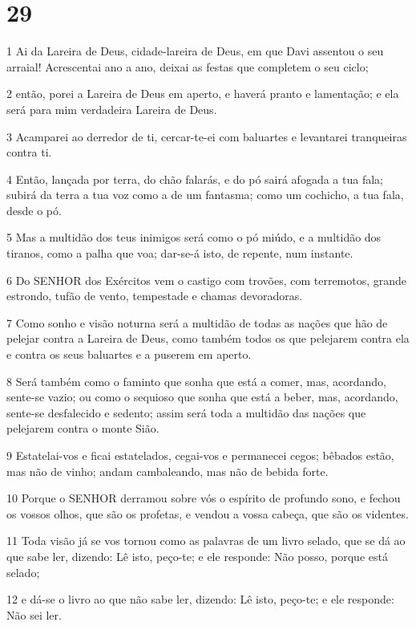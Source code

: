 \chapter{29}

\par 1 Ai da Lareira de Deus, cidade-lareira de Deus, em que Davi assentou o seu arraial! Acrescentai ano a ano, deixai as festas que completem o seu ciclo;
\par 2 então, porei a Lareira de Deus em aperto, e haverá pranto e lamentação; e ela será para mim verdadeira Lareira de Deus.
\par 3 Acamparei ao derredor de ti, cercar-te-ei com baluartes e levantarei tranqueiras contra ti.
\par 4 Então, lançada por terra, do chão falarás, e do pó sairá afogada a tua fala; subirá da terra a tua voz como a de um fantasma; como um cochicho, a tua fala, desde o pó.
\par 5 Mas a multidão dos teus inimigos será como o pó miúdo, e a multidão dos tiranos, como a palha que voa; dar-se-á isto, de repente, num instante.
\par 6 Do SENHOR dos Exércitos vem o castigo com trovões, com terremotos, grande estrondo, tufão de vento, tempestade e chamas devoradoras.
\par 7 Como sonho e visão noturna será a multidão de todas as nações que hão de pelejar contra a Lareira de Deus, como também todos os que pelejarem contra ela e contra os seus baluartes e a puserem em aperto.
\par 8 Será também como o faminto que sonha que está a comer, mas, acordando, sente-se vazio; ou como o sequioso que sonha que está a beber, mas, acordando, sente-se desfalecido e sedento; assim será toda a multidão das nações que pelejarem contra o monte Sião.
\par 9 Estatelai-vos e ficai estatelados, cegai-vos e permanecei cegos; bêbados estão, mas não de vinho; andam cambaleando, mas não de bebida forte.
\par 10 Porque o SENHOR derramou sobre vós o espírito de profundo sono, e fechou os vossos olhos, que são os profetas, e vendou a vossa cabeça, que são os videntes.
\par 11 Toda visão já se vos tornou como as palavras de um livro selado, que se dá ao que sabe ler, dizendo: Lê isto, peço-te; e ele responde: Não posso, porque está selado;
\par 12 e dá-se o livro ao que não sabe ler, dizendo: Lê isto, peço-te; e ele responde: Não sei ler.
